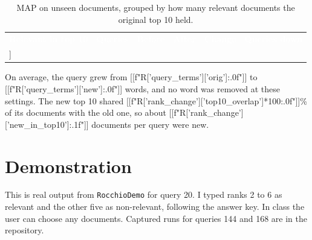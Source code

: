 \begin{table}[H]\small\centering\caption{MAP on unseen documents, grouped by how many relevant documents the original top 10 held.}
\begin{tabular}{lrrrrr}\rowcolor{navy}\textcolor{white}{\textbf{Relevant in top 10}} & \textcolor{white}{\textbf{Queries}} & \textcolor{white}{\textbf{Before}} & \textcolor{white}{\textbf{After}} & \textcolor{white}{\textbf{Change}} & \textcolor{white}{\textbf{Queries down}} \\
[[t_group()]]
\hline\end{tabular}\end{table}
On average, the query grew from [[f"{R['query_terms']['orig']:.0f}"]] to [[f"{R['query_terms']['new']:.0f}"]] words, and no word was removed at these settings. The new top 10 shared [[f"{R['rank_change']['top10_overlap']*100:.0f}"]]\% of its documents with the old one, so about [[f"{R['rank_change']['new_in_top10']:.1f}"]] documents per query were new.

\section{Demonstration}
This is real output from \texttt{RocchioDemo} for query 20. I typed ranks 2 to 6 as relevant and the other five as non-relevant, following the answer key. In class the user can choose any documents. Captured runs for queries 144 and 168 are in the repository.



